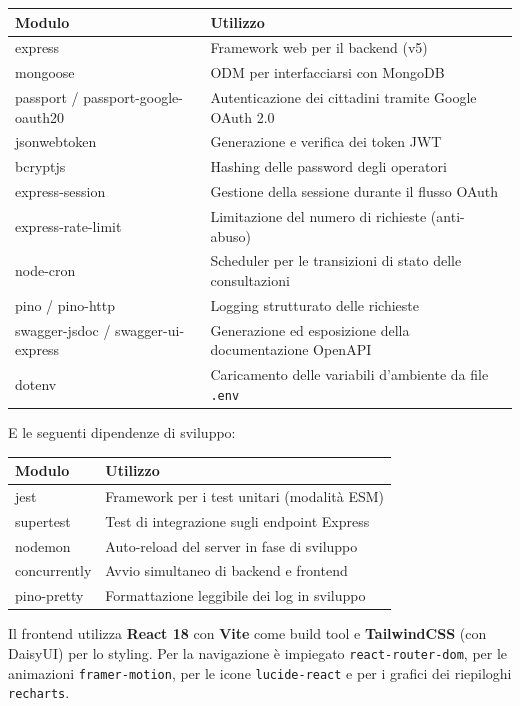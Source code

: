 \documentclass{article}
\newcommand{\code}[1]{\texttt{\small #1}}
\begin{document}
\renewcommand{\arraystretch}{1.15}
\begin{longtable}{L{4cm} L{9cm}}
	\toprule
	\textbf{Modulo} & \textbf{Utilizzo} \\
	\midrule
	\endhead
	express              & Framework web per il backend (v5) \\
	mongoose             & ODM per interfacciarsi con MongoDB \\
	passport / passport-google-oauth20 & Autenticazione dei cittadini tramite Google OAuth 2.0 \\
	jsonwebtoken         & Generazione e verifica dei token JWT \\
	bcryptjs             & Hashing delle password degli operatori \\
	express-session      & Gestione della sessione durante il flusso OAuth \\
	express-rate-limit   & Limitazione del numero di richieste (anti-abuso) \\
	node-cron            & Scheduler per le transizioni di stato delle consultazioni \\
	pino / pino-http     & Logging strutturato delle richieste \\
	swagger-jsdoc / swagger-ui-express & Generazione ed esposizione della documentazione OpenAPI \\
	dotenv               & Caricamento delle variabili d'ambiente da file \code{.env} \\
	\bottomrule
\end{longtable}

\noindent E le seguenti dipendenze di sviluppo:

\begin{longtable}{L{4cm} L{9cm}}
	\toprule
	\textbf{Modulo} & \textbf{Utilizzo} \\
	\midrule
	jest          & Framework per i test unitari (modalità ESM) \\
	supertest     & Test di integrazione sugli endpoint Express \\
	nodemon       & Auto-reload del server in fase di sviluppo \\
	concurrently  & Avvio simultaneo di backend e frontend \\
	pino-pretty   & Formattazione leggibile dei log in sviluppo \\
	\bottomrule
\end{longtable}

\noindent Il frontend utilizza \textbf{React 18} con \textbf{Vite} come build tool e
\textbf{TailwindCSS} (con DaisyUI) per lo styling. Per la navigazione è impiegato
\code{react-router-dom}, per le animazioni \code{framer-motion}, per le icone
\code{lucide-react} e per i grafici dei riepiloghi \code{recharts}.
\end{document}

